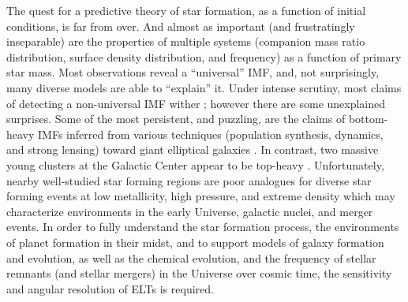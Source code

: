 \documentclass[11pt]{article}
\begin{document}
The quest for a predictive theory of star formation, as a function of initial conditions, is far from over.  And almost as important (and frustratingly inseparable) are the properties of multiple systems (companion mass ratio distribution, surface density distribution, and frequency) as a function of primary star mass. 
Most observations reveal a “universal” IMF, and, not surprisingly, many diverse models are able to “explain” it. 
Under intense scrutiny, most claims of detecting a non-universal IMF wither \citep[c.f.][]{Bastian:2010,Luhman:2018}; however there are some unexplained surprises.  
Some of the most persistent, and puzzling, are the claims of bottom-heavy IMFs inferred from various techniques (population synthesis, dynamics, and strong lensing) toward giant elliptical galaxies \citep[e.g.][]{vanDokkum:2010}.  In contrast, two massive young clusters at the Galactic Center appear to be top-heavy \citep{Lu:2013,Hosek:2018b}.
Unfortunately, nearby well-studied star forming regions are poor analogues for diverse star forming events at low metallicity, high pressure, and extreme density which may characterize environments in the early Universe, galactic nuclei, and merger events. 
In order to fully understand the star formation process, the environments of planet formation in their midst, and to support models of galaxy formation and evolution, as well as the chemical evolution, and the frequency of stellar remnants (and stellar mergers) in the Universe over cosmic time, the sensitivity and angular resolution of ELTs is required.
 
\end{document}
